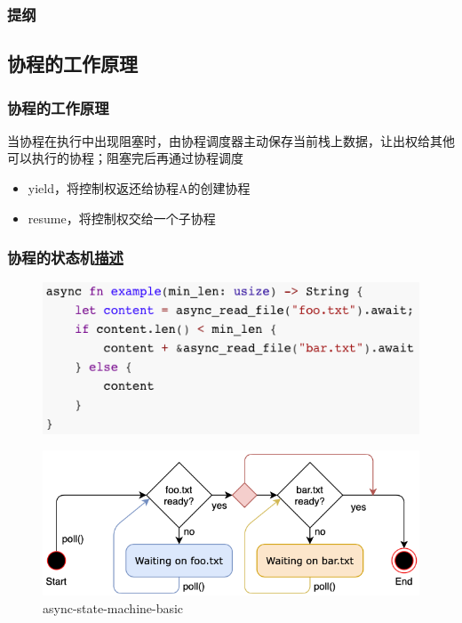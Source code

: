 % 
\begin{frame}
\frametitle{提纲} %
\tableofcontents %
\end{frame}
\subsection{协程的工作原理}
% 
\begin{frame}[fragile]
    \frametitle{协程的工作原理}
% 
当协程在执行中出现阻塞时，由协程调度器主动保存当前栈上数据，让出权给其他可以执行的协程；阻塞完后再通过协程调度%

    \begin{itemize}
        \item yield，将控制权返还给协程A的创建协程
        \item resume，将控制权交给一个子协程
    \end{itemize}

% 

\end{frame}
\begin{frame}[fragile]
    \frametitle{协程的状态机\href{https://os.phil-opp.com/async-await/\#the-async-await-pattern}{描述}}
% 
	\begin{figure}
		\centering
		\includegraphics[width=0.6\linewidth]{figs/Rust-fsm.png}
	\end{figure}


% 
	\begin{figure}
		\centering
		\includegraphics[width=0.4\linewidth]{figs/async-state-machine-basic.png}
    \caption{async-state-machine-basic}
  \end{figure}


% 
% 
% 

\end{frame}

